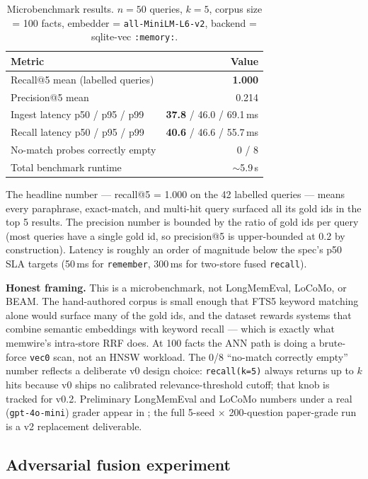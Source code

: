 \documentclass[11pt,letterpaper,twocolumn]{article}
\begin{document}
\begin{table}[t]
\centering
\caption{Microbenchmark results. $n=50$ queries, $k=5$, corpus size = 100 facts, embedder = \texttt{all-MiniLM-L6-v2}, backend = sqlite-vec \texttt{:memory:}.}
\label{tab:microbench}
\small
\begin{tabular}{lr}
\toprule
\textbf{Metric} & \textbf{Value} \\
\midrule
Recall@5 mean (labelled queries) & \textbf{1.000} \\
Precision@5 mean & 0.214 \\
Ingest latency p50 / p95 / p99 & \textbf{37.8} / 46.0 / 69.1\,ms \\
Recall latency p50 / p95 / p99 & \textbf{40.6} / 46.6 / 55.7\,ms \\
No-match probes correctly empty & 0 / 8 \\
Total benchmark runtime & $\sim$5.9\,s \\
\bottomrule
\end{tabular}
\end{table}

The headline number --- recall@5 = 1.000 on the 42 labelled queries --- means every paraphrase, exact-match, and multi-hit query surfaced all its gold ids in the top 5 results. The precision number is bounded by the ratio of gold ids per query (most queries have a single gold id, so precision@5 is upper-bounded at 0.2 by construction). Latency is roughly an order of magnitude below the spec's p50 SLA targets (50\,ms for \texttt{remember}, 300\,ms for two-store fused \texttt{recall}).

\textbf{Honest framing.} This is a microbenchmark, not LongMemEval, LoCoMo, or BEAM. The hand-authored corpus is small enough that FTS5 keyword matching alone would surface many of the gold ids, and the dataset rewards systems that combine semantic embeddings with keyword recall --- which is exactly what memwire's intra-store RRF does. At 100 facts the ANN path is doing a brute-force \texttt{vec0} scan, not an HNSW workload. The 0/8 ``no-match correctly empty'' number reflects a deliberate v0 design choice: \texttt{recall(k=5)} always returns up to $k$ hits because v0 ships no calibrated relevance-threshold cutoff; that knob is tracked for v0.2. Preliminary LongMemEval and LoCoMo numbers under a real (\texttt{gpt-4o-mini}) grader appear in ; the full 5-seed $\times$ 200-question paper-grade run is a v2 replacement deliverable.

\subsection{Adversarial fusion experiment}
\label{sec:eval-adversarial}
\end{document}
